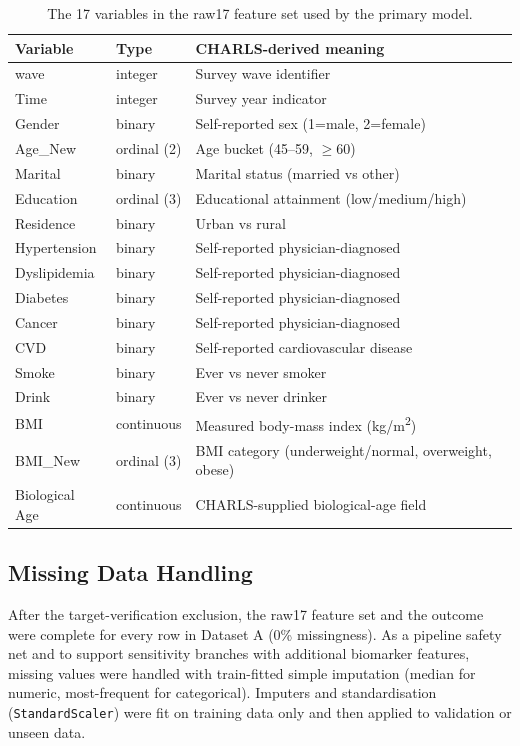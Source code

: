 \documentclass[11pt,a4paper]{article}
\begin{document}
\begin{table}[h!]
\centering
\small
\caption{The 17 variables in the raw17 feature set used by the primary model.}
\label{tab:raw17}
\begin{tabular}{llp{6.2cm}}
\toprule
Variable & Type & CHARLS-derived meaning \\
\midrule
wave & integer & Survey wave identifier \\
Time & integer & Survey year indicator \\
Gender & binary & Self-reported sex (1=male, 2=female) \\
Age\_New & ordinal (2) & Age bucket (45--59, $\geq 60$) \\
Marital & binary & Marital status (married vs other) \\
Education & ordinal (3) & Educational attainment (low/medium/high) \\
Residence & binary & Urban vs rural \\
Hypertension & binary & Self-reported physician-diagnosed \\
Dyslipidemia & binary & Self-reported physician-diagnosed \\
Diabetes & binary & Self-reported physician-diagnosed \\
Cancer & binary & Self-reported physician-diagnosed \\
CVD & binary & Self-reported cardiovascular disease \\
Smoke & binary & Ever vs never smoker \\
Drink & binary & Ever vs never drinker \\
BMI & continuous & Measured body-mass index (kg/m\textsuperscript{2}) \\
BMI\_New & ordinal (3) & BMI category (underweight/normal, overweight, obese) \\
Biological Age & continuous & CHARLS-supplied biological-age field \\
\bottomrule
\end{tabular}
\end{table}

\subsection{Missing Data Handling}
After the target-verification exclusion, the raw17 feature set and the outcome were complete for every
row in Dataset A (0\% missingness). As a pipeline safety net and to support sensitivity branches with
additional biomarker features, missing values were handled with train-fitted simple imputation (median
for numeric, most-frequent for categorical). Imputers and standardisation (\texttt{StandardScaler})
were fit on training data only and then applied to validation or unseen data.
\end{document}
